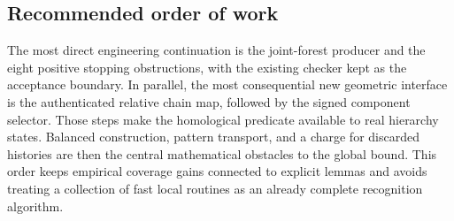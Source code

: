 \subsection{Recommended order of work}

The most direct engineering continuation is the joint-forest producer and
the eight positive stopping obstructions, with the existing checker kept
as the acceptance boundary. In parallel, the most consequential new
geometric interface is the authenticated relative chain map, followed by
the signed component selector. Those steps make the homological predicate
available to real hierarchy states. Balanced construction, pattern
transport, and a charge for discarded histories are then the central
mathematical obstacles to the global bound. This order keeps empirical
coverage gains connected to explicit lemmas and avoids treating a collection
of fast local routines as an already complete recognition algorithm.
